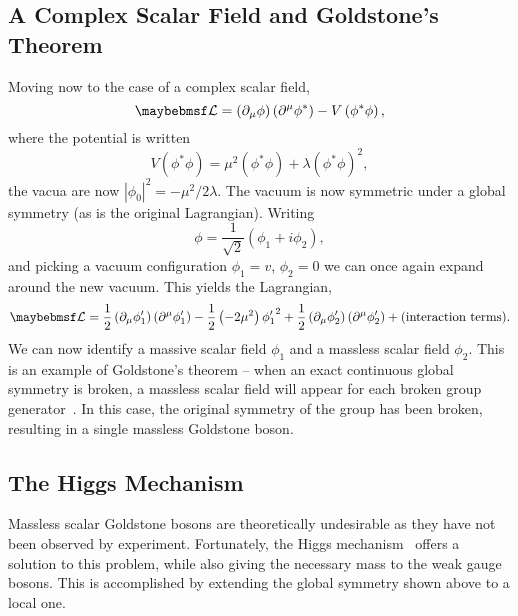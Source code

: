 \subsection{A Complex Scalar Field and Goldstone's Theorem}
\label{sec:sm_goldstone}
Moving now to the case of a complex scalar field,
\begin{equation*}
\lagrangiand = \left(\partial_{\mu}\phi\right)\left(\partial^{\mu}\phi^*\right)
- V\left(\phi^*\phi\right),
\end{equation*}
where the potential is written
\begin{equation*}
V\left(\phi^*\phi\right) = \mu^2\left(\phi^*\phi\right) +
\lambda\left(\phi^*\phi\right)^2,
\end{equation*}
the vacua are now $\left|\phi_0\right|^2 = -\mu^2/2\lambda$. The vacuum is now
symmetric under a global \Uone symmetry (as is the original Lagrangian). Writing
\begin{equation*}
\phi = \frac{1}{\sqrt{2}}\left(\phi_1 + i\phi_2\right),
\end{equation*}
and picking a vacuum configuration $\phi_1 = v$, $\phi_2 = 0$ we can once again
expand around the new vacuum. This yields the Lagrangian,
\begin{equation*}
  \lagrangiand =
  \frac{1}{2}\left(\partial_{\mu}\phi'_1\right)\left(\partial^{\mu}\phi'_1\right)
  -\frac{1}{2}\left(-2\mu^2\right){\phi'_1}^2 +
  \frac{1}{2}\left(\partial_{\mu}\phi'_2\right)\left(\partial^{\mu}\phi'_2\right)
  + \textrm{(interaction terms)}.
\end{equation*}
We can now identify a massive scalar field $\phi_1$ and a massless scalar field
$\phi_2$. This is an example of Goldstone's theorem -- when an exact continuous
global symmetry is broken, a massless scalar field will appear for each broken
group generator~\cite{nambu,goldstone}. In this case, the original \Uone
symmetry of the group has been broken, resulting in a single massless Goldstone
boson.

\subsection{The Higgs Mechanism}\label{sec:sm_higgs}
Massless scalar Goldstone bosons are theoretically undesirable as they have not
been observed by experiment. Fortunately, the Higgs
mechanism~\cite{higgs,kibble,englert} offers a solution to this problem, while
also giving the necessary mass to the weak gauge bosons. This is accomplished by
extending the global symmetry shown above to a local one.

